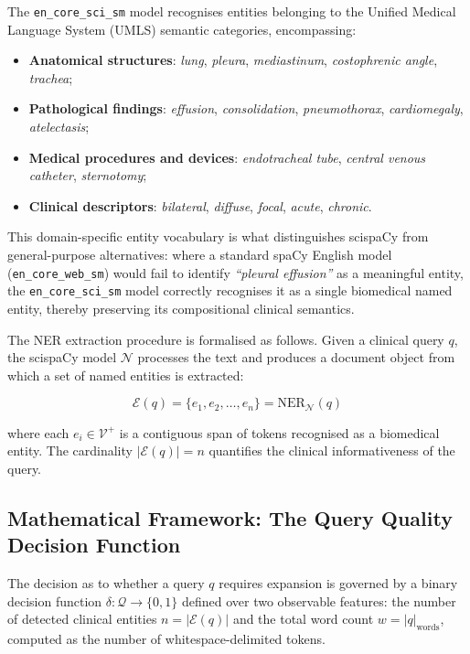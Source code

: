 The \texttt{en\_core\_sci\_sm} model recognises entities belonging to the Unified Medical Language System (UMLS) semantic categories, encompassing:

\begin{itemize}
    \item \textbf{Anatomical structures}: \textit{lung}, \textit{pleura}, \textit{mediastinum}, \textit{costophrenic angle}, \textit{trachea};
    \item \textbf{Pathological findings}: \textit{effusion}, \textit{consolidation}, \textit{pneumothorax}, \textit{cardiomegaly}, \textit{atelectasis};
    \item \textbf{Medical procedures and devices}: \textit{endotracheal tube}, \textit{central venous catheter}, \textit{sternotomy};
    \item \textbf{Clinical descriptors}: \textit{bilateral}, \textit{diffuse}, \textit{focal}, \textit{acute}, \textit{chronic}.
\end{itemize}

This domain-specific entity vocabulary is what distinguishes scispaCy from general-purpose alternatives: where a standard spaCy English model (\texttt{en\_core\_web\_sm}) would fail to identify \textit{``pleural effusion''} as a meaningful entity, the \texttt{en\_core\_sci\_sm} model correctly recognises it as a single biomedical named entity, thereby preserving its compositional clinical semantics.

The NER extraction procedure is formalised as follows. Given a clinical query $q$, the scispaCy model $\mathcal{N}$ processes the text and produces a document object from which a set of named entities is extracted:

$$
\mathcal{E}(q) = \{e_1, e_2, \ldots, e_n\} = \text{NER}_{\mathcal{N}}(q)
$$

where each $e_i \in \mathcal{V}^+$ is a contiguous span of tokens recognised as a biomedical entity. The cardinality $|\mathcal{E}(q)| = n$ quantifies the clinical informativeness of the query.

\subsection{Mathematical Framework: The Query Quality Decision Function}
\label{sec:3_2_3}
The decision as to whether a query $q$ requires expansion is governed by a binary decision function $\delta : \mathcal{Q} \to \{0, 1\}$ defined over two observable features: the number of detected clinical entities $n = |\mathcal{E}(q)|$ and the total word count $w = |q|_{\text{words}}$, computed as the number of whitespace-delimited tokens.

